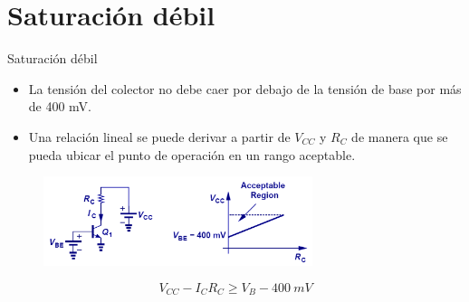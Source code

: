 \documentclass[t,aspectratio=169]{beamer}
\begin{document}
\section{Saturación débil}
\begin{frame}{Saturación débil}

\begin{itemize}
    \item La tensión del colector no debe caer por debajo de la tensión de base por más de 400 mV.
    \item Una relación lineal se puede derivar a partir de $V_{CC}$ y $R_C$ de manera que se pueda ubicar el punto de operación en un rango aceptable.
\end{itemize}

\begin{figure}
    \centering
    \includegraphics[width=0.7\textwidth]{figures/saturacion_debil.png}
\end{figure}
%
\[ V_{CC} - I_C R_C \geq V_{B} - 400\ mV \]
    
\end{frame}
\end{document}
